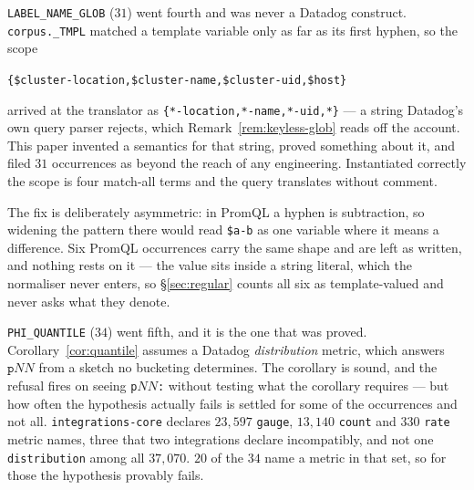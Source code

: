 \texttt{LABEL\_NAME\_GLOB} ($31$) went fourth and was never a Datadog construct.
\texttt{corpus.\_TMPL} matched a template variable only as far as its first hyphen, so
the scope
\begin{center}\footnotesize
\texttt{\{\$cluster-location,\$cluster-name,\$cluster-uid,\$host\}}
\end{center}
arrived at the translator as \texttt{\{*-location,*-name,*-uid,*\}} --- a string
Datadog's own query parser rejects, which Remark~\ref{rem:keyless-glob} reads off the
account. This paper
invented a semantics for that string, proved something about it, and filed $31$
occurrences as beyond the reach of any engineering. Instantiated correctly the scope is
four match-all terms and the query translates without comment.

The fix is deliberately asymmetric: in PromQL a hyphen is subtraction, so widening the
pattern there would read \texttt{\$a-b} as one variable where it means a difference. Six
PromQL occurrences carry the same shape and are left as written, and nothing rests on
it --- the value sits inside a string literal, which the normaliser never enters, so
\S\ref{sec:regular} counts all six as template-valued and never asks what they denote.

\texttt{PHI\_QUANTILE} ($34$) went fifth, and it is the one that was proved.
Corollary~\ref{cor:quantile} assumes a Datadog \emph{distribution} metric, which answers
$\mathtt{p}NN$ from a sketch no bucketing determines. The corollary is sound, and the
refusal fires on seeing \texttt{p}$NN$\texttt{:} without testing what the corollary
requires --- but how often the hypothesis actually fails is settled for some of the
occurrences and not all. \texttt{integrations-core} declares $23{,}597$ \texttt{gauge},
$13{,}140$ \texttt{count} and $330$ \texttt{rate} metric names, three that two
integrations declare incompatibly, and not one \texttt{distribution} among all
$37{,}070$. $20$ of the $34$ name a metric in that set, so for those the hypothesis
provably fails.

